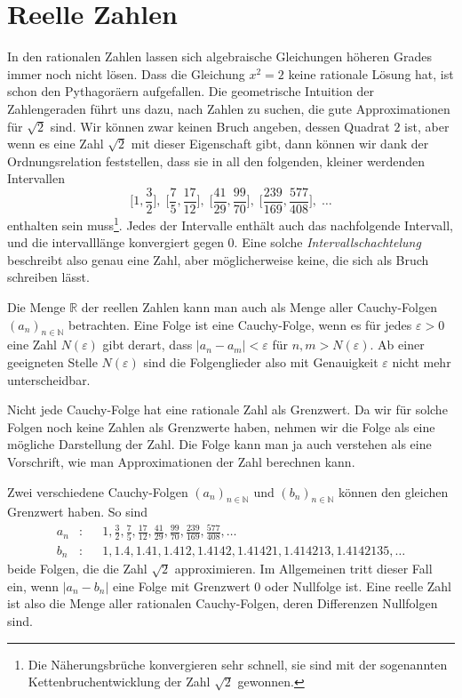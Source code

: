 %
%
%
\section{Reelle Zahlen
\label{buch:section:reelle-zahlen}}
In den rationalen Zahlen lassen sich algebraische Gleichungen höheren
Grades immer noch nicht lösen.
Dass die Gleichung $x^2=2$ keine rationale Lösung hat, ist schon den
Pythagoräern aufgefallen.
Die geometrische Intuition der Zahlengeraden führt uns dazu, nach
Zahlen zu suchen, die gute Approximationen für $\sqrt{2}$ sind.
Wir können zwar keinen Bruch angeben, dessen Quadrat $2$ ist, aber
wenn es eine Zahl $\sqrt{2}$ mit dieser Eigenschaft gibt, dann können
wir dank der Ordnungsrelation feststellen, dass sie in all den folgenden,
kleiner werdenden Intervallen
\[
\biggl[1,\frac32\biggr],\;
\biggl[\frac75,\frac{17}{12}\biggr],\;
\biggl[\frac{41}{29},\frac{99}{70}\biggr],\;
\biggl[\frac{239}{169},\frac{577}{408}\biggr],\;
\dots
\]
enthalten sein muss\footnote{Die Näherungsbrüche konvergieren sehr
schnell, sie sind mit der sogenannten Kettenbruchentwicklung der
Zahl $\sqrt{2}$ gewonnen.}.
Jedes der Intervalle enthält auch das nachfolgende Intervall, und
die intervalllänge konvergiert gegen 0.
Eine solche \emph{Intervallschachtelung} beschreibt also genau eine Zahl,
aber möglicherweise keine, die sich als Bruch schreiben lässt.

Die Menge $\mathbb{R}$ der reellen Zahlen kann man auch als Menge
aller Cauchy-Folgen $(a_n)_{n\in\mathbb{N}}$ betrachten.
Eine Folge ist eine Cauchy-Folge, wenn es für jedes $\varepsilon>0$
eine Zahl $N(\varepsilon)$ gibt derart, dass $|a_n-a_m|<\varepsilon$
für $n,m>N(\varepsilon)$.
Ab einer geeigneten Stelle $N(\varepsilon)$ sind die Folgenglieder also
mit Genauigkeit $\varepsilon$ nicht mehr unterscheidbar.

Nicht jede Cauchy-Folge hat eine rationale Zahl als Grenzwert.
Da wir für solche Folgen noch keine Zahlen als Grenzwerte haben,
nehmen wir die Folge als eine mögliche Darstellung der Zahl.
Die Folge kann man ja auch verstehen als eine Vorschrift, wie man
Approximationen der Zahl berechnen kann.

Zwei verschiedene Cauchy-Folgen $(a_n)_{n\in\mathbb{N}}$ und
$(b_n)_{n\in\mathbb{N}}$ 
können den gleichen Grenzwert haben.
So sind 
\[
\begin{aligned}
a_n&\colon&&
1,\frac32,\frac75,\frac{17}{12},\frac{41}{29},\frac{99}{70},\frac{239}{169},
\frac{577}{408},\dots
\\
b_n&\colon&&
1,1.4,1.41,1.412,1.4142,1.41421,1.414213,1.4142135,\dots
\end{aligned}
\]
beide Folgen, die die Zahl $\sqrt{2}$ approximieren.
Im Allgemeinen tritt dieser Fall ein, wenn $|a_n-b_n|$ eine
Folge mit Grenzwert $0$ oder Nullfolge ist.
Eine reelle Zahl ist also die Menge aller rationalen Cauchy-Folgen,
deren Differenzen Nullfolgen sind.

